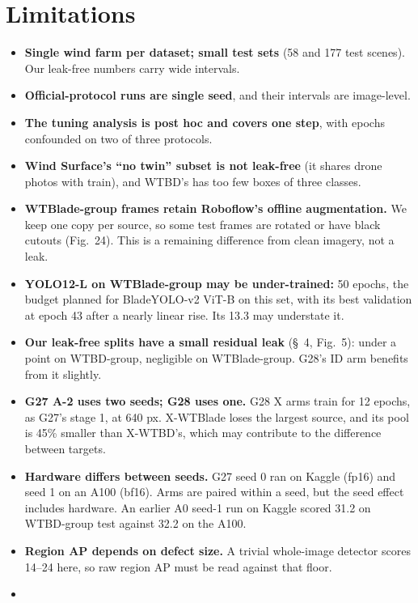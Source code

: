 \documentclass[
  10pt,
]{article}
\providecommand{\tightlist}{%
  \setlength{\itemsep}{0pt}\setlength{\parskip}{0pt}}
\begin{document}
\section{Limitations}\label{sec:limits}

\begin{itemize}
\tightlist
\item
  \textbf{Single wind farm per dataset; small test sets} (58 and 177
  test scenes). Our leak-free numbers carry wide intervals.
\item
  \textbf{Official-protocol runs are single seed}, and their intervals
  are image-level.
\item
  \textbf{The tuning analysis is post hoc and covers one step}, with
  epochs confounded on two of three protocols.
\item
  \textbf{Wind Surface's ``no twin'' subset is not leak-free} (it shares
  drone photos with train), and WTBD's has too few boxes of three
  classes.
\item
  \textbf{WTBlade-group frames retain Roboflow's offline augmentation.}
  We keep one copy per source, so some test frames are rotated or have
  black cutouts (Fig.~24). This is a remaining difference from clean
  imagery, not a leak.
\item
  \textbf{YOLO12-L on WTBlade-group may be under-trained:} 50 epochs,
  the budget planned for BladeYOLO-v2 ViT-B on this set, with its best
  validation at epoch 43 after a nearly linear rise. Its 13.3 may
  understate it.
\item
  \textbf{Our leak-free splits have a small residual leak} (§~4,
  Fig.~5): under a point on WTBD-group, negligible on WTBlade-group.
  G28's ID arm benefits from it slightly.
\item
  \textbf{G27 A-2 uses two seeds; G28 uses one.} G28 X arms train for 12
  epochs, as G27's stage 1, at 640 px. X-WTBlade loses the largest
  source, and its pool is 45\% smaller than X-WTBD's, which may
  contribute to the difference between targets.
\item
  \textbf{Hardware differs between seeds.} G27 seed 0 ran on Kaggle
  (fp16) and seed 1 on an A100 (bf16). Arms are paired within a seed,
  but the seed effect includes hardware. An earlier A0 seed-1 run on
  Kaggle scored 31.2 on WTBD-group test against 32.2 on the A100.
\item
  \textbf{Region AP depends on defect size.} A trivial whole-image
  detector scores 14--24 here, so raw region AP must be read against
  that floor.
\item

\end{itemize}
\end{document}

